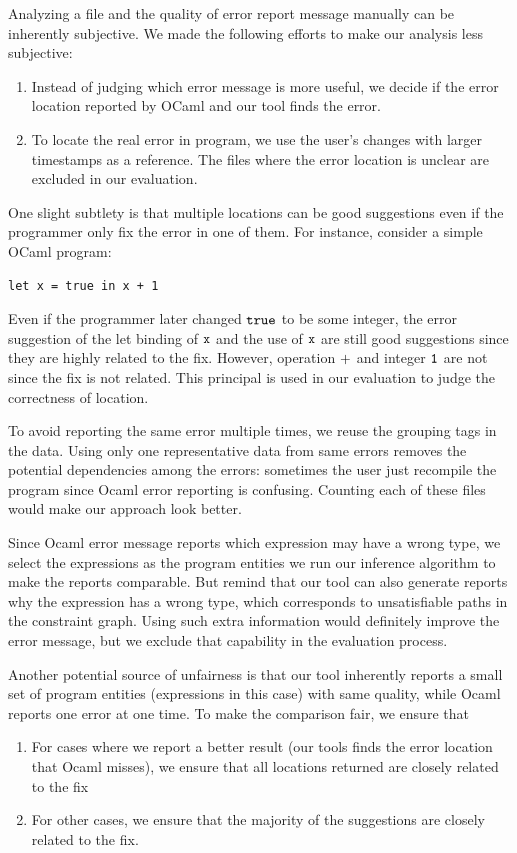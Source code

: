 Analyzing a file and the quality of error report message manually can
be inherently subjective. We made the following efforts to make our
analysis less subjective:
\begin{enumerate}
\item Instead of judging which error message is more useful, we decide
if the error location reported by OCaml and our tool finds the error.

\item To locate the real error in program, we use the user's changes
with larger timestamps as a reference. The files where the error
location is unclear are excluded in our evaluation.
\end{enumerate}

One slight subtlety is that multiple locations can be good suggestions
even if the programmer only fix the error in one of them. For
instance, consider a simple OCaml program:
\begin{lstlisting}
let x = true in x + 1
\end{lstlisting}

Even if the programmer later changed $\mathtt{true}$ to be some integer,
the error suggestion of the let binding of $\mathtt{x}$ and the use of
$\mathtt{x}$ are still good suggestions since they are highly related to
the fix. However, operation $\mathtt{+}$ and integer $\mathtt{1}$ are not
since the fix is not related. This principal is used in our evaluation
to judge the correctness of location.

To avoid reporting the same error multiple times, we reuse the
grouping tags in the data. Using only one representative data from
same errors removes the potential dependencies among the errors:
sometimes the user just recompile the program since Ocaml error
reporting is confusing. Counting each of these files would make our
approach look better.

Since Ocaml error message reports which expression may have a wrong
type, we select the expressions as the program entities we run our
inference algorithm to make the reports comparable. But remind that
our tool can also generate reports why the expression has a wrong
type, which corresponds to unsatisfiable paths in the constraint
graph. Using such extra information would definitely improve the error
message, but we exclude that capability in the evaluation process.

Another potential source of unfairness is that our tool inherently
reports a small set of program entities (expressions in this case)
with same quality, while Ocaml reports one error at one time. To make
the comparison fair, we ensure that 
\begin{enumerate}
\item For cases where we report a better result (our tools finds the
error location that Ocaml misses), we ensure that all locations
returned are closely related to the fix

\item For other cases, we ensure that the majority of the suggestions
are closely related to the fix. 
\end{enumerate}


